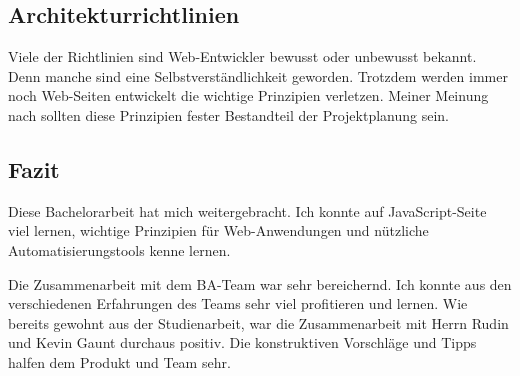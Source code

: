 \subsection*{Architekturrichtlinien}
Viele der Richtlinien sind Web-Entwickler bewusst oder unbewusst bekannt. Denn manche sind eine Selbstverständlichkeit geworden. Trotzdem werden immer noch Web-Seiten entwickelt die wichtige Prinzipien verletzen.
Meiner Meinung nach sollten diese Prinzipien fester Bestandteil der Projektplanung sein.


\subsection*{Fazit}
Diese Bachelorarbeit hat mich weitergebracht. Ich konnte auf JavaScript-Seite viel lernen, wichtige Prinzipien für Web-Anwendungen und nützliche Automatisierungstools kenne lernen.

Die Zusammenarbeit mit dem BA-Team war sehr bereichernd. Ich konnte aus den verschiedenen Erfahrungen des Teams sehr viel profitieren und lernen. Wie bereits gewohnt aus der Studienarbeit, war die Zusammenarbeit mit Herrn Rudin und Kevin Gaunt durchaus positiv. Die konstruktiven Vorschläge und Tipps halfen dem Produkt und Team sehr.